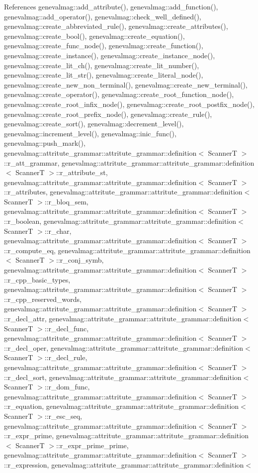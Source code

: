 References genevalmag::add\_\-attribute(), genevalmag::add\_\-function(), genevalmag::add\_\-operator(), genevalmag::check\_\-well\_\-defined(), genevalmag::create\_\-abbreviated\_\-rule(), genevalmag::create\_\-attributes(), genevalmag::create\_\-bool(), genevalmag::create\_\-equation(), genevalmag::create\_\-func\_\-node(), genevalmag::create\_\-function(), genevalmag::create\_\-instance(), genevalmag::create\_\-instance\_\-node(), genevalmag::create\_\-lit\_\-ch(), genevalmag::create\_\-lit\_\-number(), genevalmag::create\_\-lit\_\-str(), genevalmag::create\_\-literal\_\-node(), genevalmag::create\_\-new\_\-non\_\-terminal(), genevalmag::create\_\-new\_\-terminal(), genevalmag::create\_\-operator(), genevalmag::create\_\-root\_\-function\_\-node(), genevalmag::create\_\-root\_\-infix\_\-node(), genevalmag::create\_\-root\_\-postfix\_\-node(), genevalmag::create\_\-root\_\-prefix\_\-node(), genevalmag::create\_\-rule(), genevalmag::create\_\-sort(), genevalmag::decrement\_\-level(), genevalmag::increment\_\-level(), genevalmag::inic\_\-func(), genevalmag::push\_\-mark(), genevalmag::attritute\_\-grammar::attritute\_\-grammar::definition$<$ ScannerT $>$::r\_\-att\_\-grammar, genevalmag::attritute\_\-grammar::attritute\_\-grammar::definition$<$ ScannerT $>$::r\_\-attribute\_\-st, genevalmag::attritute\_\-grammar::attritute\_\-grammar::definition$<$ ScannerT $>$::r\_\-attributes, genevalmag::attritute\_\-grammar::attritute\_\-grammar::definition$<$ ScannerT $>$::r\_\-bloq\_\-sem, genevalmag::attritute\_\-grammar::attritute\_\-grammar::definition$<$ ScannerT $>$::r\_\-boolean, genevalmag::attritute\_\-grammar::attritute\_\-grammar::definition$<$ ScannerT $>$::r\_\-char, genevalmag::attritute\_\-grammar::attritute\_\-grammar::definition$<$ ScannerT $>$::r\_\-compute\_\-eq, genevalmag::attritute\_\-grammar::attritute\_\-grammar::definition$<$ ScannerT $>$::r\_\-conj\_\-symb, genevalmag::attritute\_\-grammar::attritute\_\-grammar::definition$<$ ScannerT $>$::r\_\-cpp\_\-basic\_\-types, genevalmag::attritute\_\-grammar::attritute\_\-grammar::definition$<$ ScannerT $>$::r\_\-cpp\_\-reserved\_\-words, genevalmag::attritute\_\-grammar::attritute\_\-grammar::definition$<$ ScannerT $>$::r\_\-decl\_\-attr, genevalmag::attritute\_\-grammar::attritute\_\-grammar::definition$<$ ScannerT $>$::r\_\-decl\_\-func, genevalmag::attritute\_\-grammar::attritute\_\-grammar::definition$<$ ScannerT $>$::r\_\-decl\_\-oper, genevalmag::attritute\_\-grammar::attritute\_\-grammar::definition$<$ ScannerT $>$::r\_\-decl\_\-rule, genevalmag::attritute\_\-grammar::attritute\_\-grammar::definition$<$ ScannerT $>$::r\_\-decl\_\-sort, genevalmag::attritute\_\-grammar::attritute\_\-grammar::definition$<$ ScannerT $>$::r\_\-dom\_\-func, genevalmag::attritute\_\-grammar::attritute\_\-grammar::definition$<$ ScannerT $>$::r\_\-equation, genevalmag::attritute\_\-grammar::attritute\_\-grammar::definition$<$ ScannerT $>$::r\_\-esc\_\-seq, genevalmag::attritute\_\-grammar::attritute\_\-grammar::definition$<$ ScannerT $>$::r\_\-expr\_\-prime, genevalmag::attritute\_\-grammar::attritute\_\-grammar::definition$<$ ScannerT $>$::r\_\-expr\_\-prime\_\-prime, genevalmag::attritute\_\-grammar::attritute\_\-grammar::definition$<$ ScannerT $>$::r\_\-expression, genevalmag::attritute\_\-grammar::attritute\_\-grammar::definition$<$ 